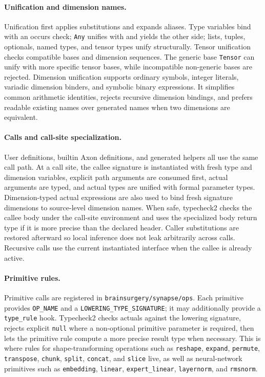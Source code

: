 \documentclass{article}
\newcommand{\code}[1]{\texttt{#1}}
\begin{document}
\paragraph{Unification and dimension names.}
Unification first applies substitutions and expands aliases.  Type variables
bind with an occurs check; \code{Any} unifies with and yields the other side;
lists, tuples, optionals, named types, and tensor types unify structurally.
Tensor unification checks compatible bases and dimension sequences.  The
generic base \code{Tensor} can unify with more specific tensor bases, while
incompatible non-generic bases are rejected.  Dimension unification supports
ordinary symbols, integer literals, variadic dimension binders, and symbolic
binary expressions.  It simplifies common arithmetic identities, rejects
recursive dimension bindings, and prefers readable existing names over
generated names when two dimensions are equivalent.

\paragraph{Calls and call-site specialization.}
User definitions, builtin Axon definitions, and generated helpers all use the
same call path.  At a call site, the callee signature is instantiated with
fresh type and dimension variables, explicit path arguments are consumed first,
actual arguments are typed, and actual types are unified with formal parameter
types.  Dimension-typed actual expressions are also used to bind fresh
signature dimensions to source-level dimension names.  When safe, typecheck2
checks the callee body under the call-site environment and uses the specialized
body return type if it is more precise than the declared header.  Caller
substitutions are restored afterward so local inference does not leak
arbitrarily across calls.  Recursive calls use the current instantiated
interface when the callee is already active.

\paragraph{Primitive rules.}
Primitive calls are registered in \code{brainsurgery/synapse/ops}.  Each
primitive provides \code{OP\_NAME} and a \code{LOWERING\_TYPE\_SIGNATURE}; it
may additionally provide a \code{type\_rule} hook.  Typecheck2 checks actuals
against the lowering signature, rejects explicit \code{null} where a
non-optional primitive parameter is required, then lets the primitive rule
compute a more precise result type when necessary.  This is where rules for
shape-transforming operations such as \code{reshape}, \code{expand},
\code{permute}, \code{transpose}, \code{chunk}, \code{split}, \code{concat},
and \code{slice} live, as well as neural-network primitives such as
\code{embedding}, \code{linear}, \verb|expert_linear|, \code{layernorm}, and
\code{rmsnorm}.
\end{document}
